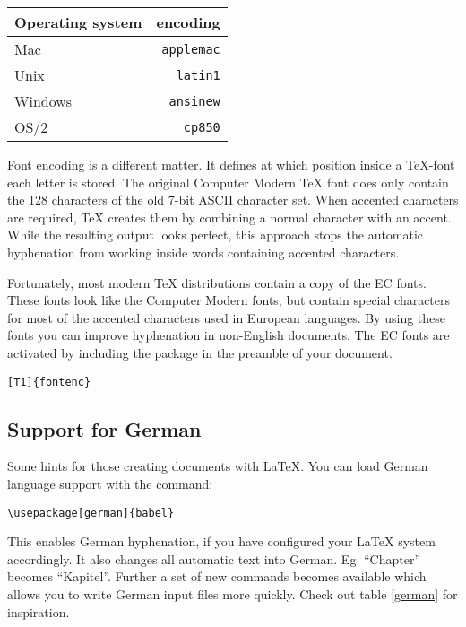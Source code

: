 \begin{center}
\begin{tabular}{l | r}
Operating system & encoding\\
\hline
Mac     &  \texttt{applemac} \\
Unix    &  \texttt{latin1} \\ 
Windows &  \texttt{ansinew} \\
OS/2    &  \texttt{cp850}
\end{tabular}
\end{center}

Font encoding is a different matter. It defines at which position inside
a \TeX-font each letter is stored. The original Computer Modern
\TeX{} font does only contain the 128 characters of the old 7-bit ASCII
character set. When accented characters are required, \TeX{} creates
them by combining a normal character with an accent. While the
resulting output looks perfect, this approach stops the automatic
hyphenation from working inside words containing accented characters.

Fortunately, most modern \TeX{} distributions contain a copy of the EC
fonts. These fonts look like the Computer Modern fonts, but contain
special characters for most of the accented characters used in
European languages. By using these fonts you can improve hyphenation
in non-English documents. The EC fonts are activated by including the
 package in the preamble of your document.

\begin{lscommand}
\verb|[T1]{fontenc}| 
\end{lscommand}
\newpage

\subsection{Support for German}

Some hints for those creating 
documents with \LaTeX{}. You can load German language support with the
command:

\begin{lscommand}
\verb|\usepackage[german]{babel}|
\end{lscommand}

This enables German hyphenation, if you have configured your
LaTeX system accordingly. It also changes all automatic text into
German. Eg. ``Chapter'' becomes ``Kapitel''. Further a set of new commands
becomes available which allows you to write German input files more
quickly. Check out table \ref{german} for inspiration. 

